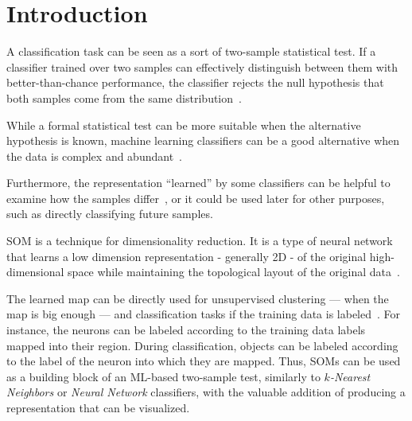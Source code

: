 \section{Introduction}

A classification task can be seen as a sort of two-sample statistical test.
If a classifier trained over two samples can effectively distinguish between
them with better-than-chance performance, the classifier rejects the null
hypothesis that both samples come from the same distribution~\cite{friedman2004multivariate}.

While a formal statistical test can be more suitable when the alternative
hypothesis is known, machine learning classifiers can be a good alternative
when the data is complex and abundant~\cite{kirchler2020two,kim2021classification,pmlr-v119-liu20m}.

Furthermore, the representation ``learned'' by some classifiers can be helpful
to examine how the samples differ~\cite{friedman2004multivariate,lopez2016revisiting},
or it could be used later for other purposes, such as directly classifying future samples.

\medskip

\gls{SOM} is a technique for dimensionality
reduction. It is a type of neural network that learns a low dimension representation
- generally 2D - of the original high-dimensional space while maintaining the topological
layout of the original data~\cite{kohonen1982self, Villmann1999}.

The learned map can be directly used for unsupervised clustering --- when the map is big enough ---
and classification tasks if the training data is labeled~\cite{ultsch2005esom,ultsch2007emergence}.
For instance, the neurons can be labeled according to the training data labels mapped into their
region. During classification, objects can be labeled according to the label of the neuron
into which they are mapped.
Thus, \glspl{SOM} can be used as a building block of an ML-based two-sample test, similarly to
\emph{$k$-Nearest Neighbors} or \emph{Neural Network} classifiers, with the valuable addition
of producing a representation that can be visualized.

